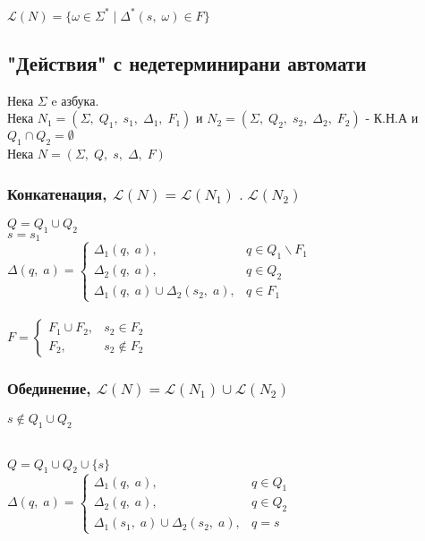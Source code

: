 \documentclass[12pt]{article}
\newcommand{\Lang}{\mathcal{L}}
\begin{document}
$\Lang(N) = \{\omega \in \Sigma^* \; | \; \Delta^*(s, \; \omega) \in F\}$

\subsection*{"Действия" с недетерминирани автомати}

Нека $\Sigma$ e азбука. \\

Нека $N_1 = (\Sigma, \; Q_1, \; s_1, \; \Delta_1, \; F_1)$ и $N_2 = (\Sigma, \; Q_2, \; s_2, \; \Delta_2, \; F_2)$  - К.Н.А и $Q_1 \cap Q_2 = \emptyset$ \\

Нека $N = (\Sigma, \; Q, \; s, \; \Delta, \; F)$

\subsubsection*{Конкатенация, $\Lang(N) = \Lang(N_1) \; . \; \Lang(N_2)$}

$Q = Q_1 \cup Q_2$ \\

$s = s_1$ \\

$\Delta(q, \; a) = \begin{cases}
    \Delta_1(q, \; a), & q \in Q_1 \backslash F_1 \\
    \Delta_2(q, \; a), & q \in Q_2 \\
    \Delta_1(q, \; a) \cup \Delta_2(s_2, \; a), & q \in F_1
\end{cases}$ \\\\

$F = \begin{cases}
  F_1 \cup F_2, & s_2 \in F_2\\
  F_2, & s_2 \notin F_2  
\end{cases}$

\subsubsection*{Обединение, $\Lang(N) = \Lang(N_1) \cup \Lang(N_2)$}

$s \not \in Q_1 \cup Q_2$ \\\

$Q = Q_1 \cup Q_2 \cup \{s\}$ \\

$\Delta(q, \; a) = \begin{cases}
    \Delta_1(q, \; a), & q \in Q_1 \\
    \Delta_2(q, \; a), & q \in Q_2 \\
    \Delta_1(s_1, \; a) \cup \Delta_2(s_2, \; a), & q = s
\end{cases}$ \\\\
\end{document}

